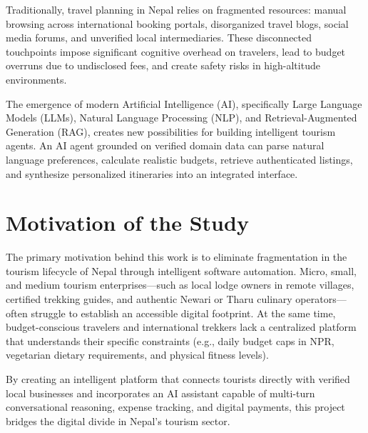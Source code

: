 \documentclass[12pt,a4paper]{report}
\begin{document}
Traditionally, travel planning in Nepal relies on fragmented resources: manual browsing across international booking portals, disorganized travel blogs, social media forums, and unverified local intermediaries. These disconnected touchpoints impose significant cognitive overhead on travelers, lead to budget overruns due to undisclosed fees, and create safety risks in high-altitude environments.

The emergence of modern Artificial Intelligence (AI), specifically Large Language Models (LLMs), Natural Language Processing (NLP), and Retrieval-Augmented Generation (RAG), creates new possibilities for building intelligent tourism agents. An AI agent grounded on verified domain data can parse natural language preferences, calculate realistic budgets, retrieve authenticated listings, and synthesize personalized itineraries into an integrated interface.

\section{Motivation of the Study}
The primary motivation behind this work is to eliminate fragmentation in the tourism lifecycle of Nepal through intelligent software automation. Micro, small, and medium tourism enterprises—such as local lodge owners in remote villages, certified trekking guides, and authentic Newari or Tharu culinary operators—often struggle to establish an accessible digital footprint. At the same time, budget-conscious travelers and international trekkers lack a centralized platform that understands their specific constraints (e.g., daily budget caps in NPR, vegetarian dietary requirements, and physical fitness levels).

By creating an intelligent platform that connects tourists directly with verified local businesses and incorporates an AI assistant capable of multi-turn conversational reasoning, expense tracking, and digital payments, this project bridges the digital divide in Nepal's tourism sector.
\end{document}

